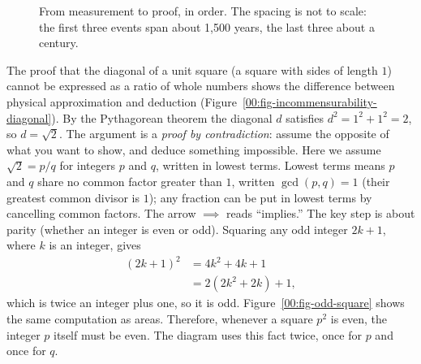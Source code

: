\begin{figure}[htbp]
\centering
{}
\caption{From measurement to proof, in order. The spacing is not to scale: the first three events span about 1{,}500 years, the last three about a century.}
\label{00:fig-timeline}
\end{figure}

The proof that the diagonal of a unit square (a square with sides of length $1$) cannot be expressed as a ratio of whole numbers shows the difference between physical approximation and deduction (Figure~\ref{00:fig-incommensurability-diagonal}). By the Pythagorean theorem the diagonal $d$ satisfies $d^2 = 1^2 + 1^2 = 2$, so $d = \sqrt{2}$. The argument is a \emph{proof by contradiction}: assume the opposite of what you want to show, and deduce something impossible. Here we assume $\sqrt{2} = p/q$ for integers $p$ and $q$, written in lowest terms. Lowest terms means $p$ and $q$ share no common factor greater than $1$, written $\gcd(p, q) = 1$ (their greatest common divisor is $1$); any fraction can be put in lowest terms by cancelling common factors. The arrow $\implies$ reads ``implies.'' The key step is about parity (whether an integer is even or odd). Squaring any odd integer $2k + 1$, where $k$ is an integer, gives
\begin{align*}
(2k + 1)^2 &= 4k^2 + 4k + 1 \\
&= 2(2k^2 + 2k) + 1,
\end{align*}
which is twice an integer plus one, so it is odd. Figure~\ref{00:fig-odd-square} shows the same computation as areas. Therefore, whenever a square $p^2$ is even, the integer $p$ itself must be even. The diagram uses this fact twice, once for $p$ and once for $q$.

